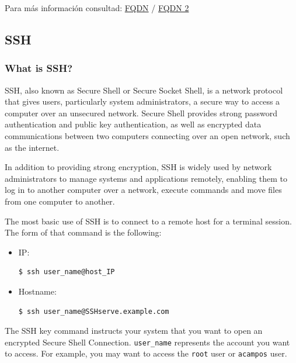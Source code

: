 \documentclass{article}
\newenvironment{codetemplate}[1][]{%
  \mybasecolorbox[#1]
  \itshape
}{%
  \endmybasecolorbox
}
\begin{document}
Para más información consultad: \href{https://www.ionos.es/digitalguide/dominios/gestion-de-dominios/fully-qualified-domain-name/}{FQDN}
/ \href{https://www.hostinger.es/tutoriales/fqdn}{FQDN 2}

\subsection{SSH}

\subsubsection{What is SSH?}

SSH, also known as Secure Shell or Secure Socket Shell, is a network protocol that gives users, particularly system administrators, a secure way to access a computer over an unsecured network.  Secure Shell provides strong password authentication and public key authentication, as well as encrypted data communications between two computers connecting over an open network, such as the internet.

In addition to providing strong encryption, SSH is widely used by network administrators to manage systems and applications remotely, enabling them to log in to another computer over a network, execute commands and move files from one computer to another.


The most basic use of SSH is to connect to a remote host for a terminal session. The form of that command is the following:
\begin{itemize}
    \item IP:
\begin{codetemplate}{}
\begin{verbatim}
$ ssh user_name@host_IP
\end{verbatim}
\end{codetemplate}
    \item Hostname:
\begin{codetemplate}{}
\begin{verbatim}
$ ssh user_name@SSHserve.example.com
\end{verbatim}
\end{codetemplate}   
\end{itemize}


The SSH key command instructs your system that you want to open an encrypted Secure Shell Connection. \verb|user_name| represents the account you want to access. For example, you may want to access the \verb|root| user or \verb|acampos| user.
\end{document}
